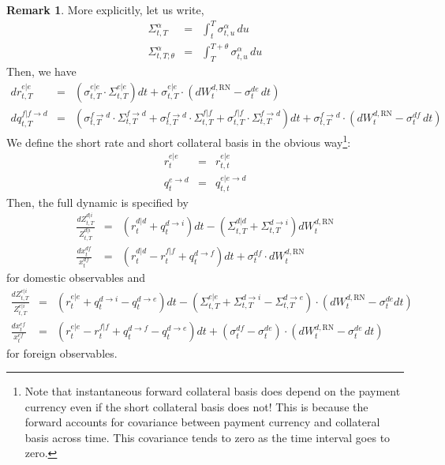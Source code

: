 \documentclass[11pt,english]{amsart}
\newcommand{\RN}{\mathrm{RN}}
\theoremstyle{definition}
\newtheorem{rema}{Remark}
\begin{document}
\begin{rema}
More explicitly, let us write, 
\begin{eqnarray}
  \Sigma^{\alpha}_{t,T} &=& \int_t^{T} \sigma^{\alpha}_{t,u}\,du \\
  \Sigma^{\alpha}_{t,T;\theta} &=& \int_T^{T+\theta} \sigma^{\alpha}_{t,u}\,du 
\end{eqnarray} 
Then, we have
\begin{eqnarray}
  dr^{e|e}_{t,T} &=& \left(\sigma^{e|e}_{t,T}\cdot \Sigma^{e|e}_{t,T} \right) dt +  \sigma^{e|e}_{t,T}\cdot \left(dW^{d,\RN}_t -\sigma^{de}_t \,dt\right)  \\
  dq^{f|f\to d}_{t,T} &=& \left(\sigma^{f\to d}_{t,T}\cdot \Sigma^{f\to d}_{t,T} + \sigma^{f\to d}_{t,T}\cdot \Sigma^{f|f}_{t,T} + \sigma^{f|f}_{t,T}\cdot \Sigma^{f\to d}_{t,T}\right) dt +  \sigma^{f\to d}_{t,T} \cdot \left( dW^{d,\RN}_t  - \sigma^{df}_t \, dt\right)
\end{eqnarray}
We define the short rate and short collateral basis in the obvious way\footnote{Note that instantaneous forward collateral basis does depend on the payment currency even if the short collateral basis does not! This is because the forward accounts for covariance between payment currency and collateral basis across time. This covariance tends to zero as the time interval goes to zero.}:
\begin{eqnarray}
  r^{e|e}_{t} &=& r^{e|e}_{t,t}  \\
  q^{e\to d}_{t} &=& q^{e|e\to d}_{t,t}
\end{eqnarray}
Then, the full dynamic is specified by
\begin{eqnarray}
  \frac{dZ^{d|i}_{t,T}}{Z^{d|i}_{t,T}} &=& \left(r^{d|d}_t + q^{d\to i}_t \right) dt - \left(\Sigma^{d|d}_{t,T} + \Sigma^{d\to i}_{t,T}  \right) dW^{d,\RN}_t  \\
   \frac{dx^{df}_{t}}{x^{df}_{t}} &=& \left(r^{d|d}_t - r^{f|f}_t + q^{d\to f}_t \right) dt + \sigma^{df}_{t} \cdot dW^{d,\RN}_t  \end{eqnarray}
for domestic observables and 
\begin{eqnarray}
  \frac{dZ^{e|i}_{t,T}}{Z^{e|i}_{t,T}} 
  &=&  \left(r^{e|e}_t + q^{d\to i}_t-q^{d\to e}_t \right)  dt 
  - \left(\Sigma^{e|e}_{t,T} + \Sigma^{d\to i}_{t,T} -  \Sigma^{d\to e}_{t,T}  \right) \cdot \left( dW^{d,\RN}_t -\sigma^{de}_tdt\right) \\
   \frac{dx^{ef}_{t}}{x^{ef}_{t}} 
   &=& \left(r^{e|e}_t - r^{f|f}_t + q^{d\to f}_t-q^{d\to e}_t \right) dt 
   + \left(\sigma^{df}_{t} - \sigma^{de}_{t}\right)  \cdot \left(dW^{d,\RN}_t - \sigma^{de}_{t}\,dt \right)  
\end{eqnarray}
for foreign observables. 
\end{rema}
\end{document}
